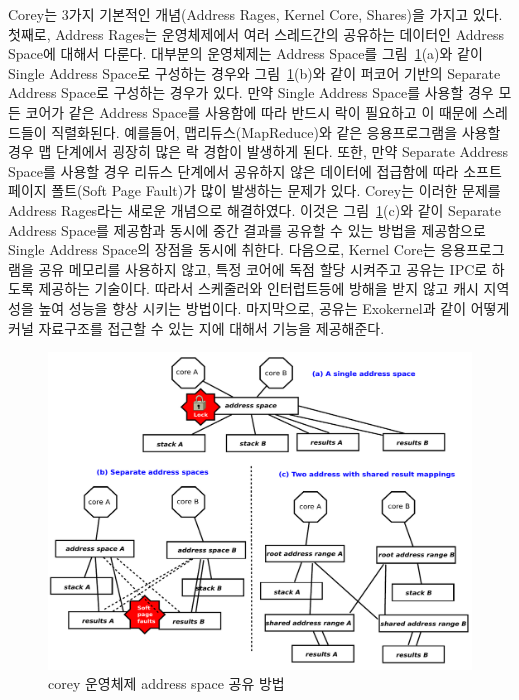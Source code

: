 Corey는 3가지 기본적인 개념(Address Rages, Kernel Core, Shares)을 가지고 있다. 
첫째로, Address Rages는 운영체제에서 여러 스레드간의 공유하는 데이터인 Address Space에 대해서 다룬다.
대부분의 운영체제는 Address Space를 그림~\ref{fig:corey}(a)와 같이 Single Address Space로
구성하는 경우와 그림~\ref{fig:corey}(b)와 같이 퍼코어 기반의 Separate Address Space로 구성하는 경우가
있다. 
만약 Single Address Space를 사용할 경우 모든 코어가 같은 Address Space를 사용함에 따라 반드시 락이
필요하고 이 때문에 스레드들이 직렬화된다.
예를들어, 맵리듀스(MapReduce)와 같은 응용프로그램을 사용할 경우 맵 단계에서 굉장히 많은 락 경합이 발생하게 된다.
또한, 만약 Separate Address Space를 사용할 경우 리듀스 단계에서 공유하지 않은 데이터에 접급함에 따라 
소프트 페이지 폴트(Soft Page Fault)가 많이 발생하는 문제가 있다.
Corey는 이러한 문제를 Address Rages라는 새로운 개념으로 해결하였다. 
이것은 그림~\ref{fig:corey}(c)와 같이 Separate Address Space를 제공함과 동시에 중간 결과를 공유할 수 있는
방법을 제공함으로 Single Address Space의 장점을 동시에 취한다.
다음으로, Kernel Core는 응용프로그램을 공유 메모리를 사용하지 않고, 특정 코어에 
독점 할당 시켜주고 공유는 IPC로 하도록 제공하는 기술이다. 
따라서 스케줄러와 인터럽트등에 방해을 받지 않고 캐시 지역성을 높여 성능을 향상 시키는 방법이다.
마지막으로, 공유는 Exokernel과 같이 어떻게 커널 자료구조를 접근할 수 있는 지에 대해서 기능을 제공해준다.

\begin{figure}[h!]
    \centering
    \includegraphics[width=1\textwidth]{fig/corey/corey}
    \caption{corey 운영체제 address space 공유 방법}
  \label{fig:corey}
\end{figure}

